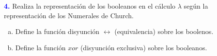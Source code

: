 \textbf{\textcolor{blue}{4.}}\Large
Realiza la representación de los booleanos en el cálculo
$\lambda$ según la representación de los Numerales de Church.
\begin{enumerate}[a)]
    \item Define la función disyunción $\leftrightarrow$ (equivalencia) sobre los boolenos.
    \item Define la función $xor$ (disyunción exclusiva) sobre los booleanos.
\end{enumerate}
